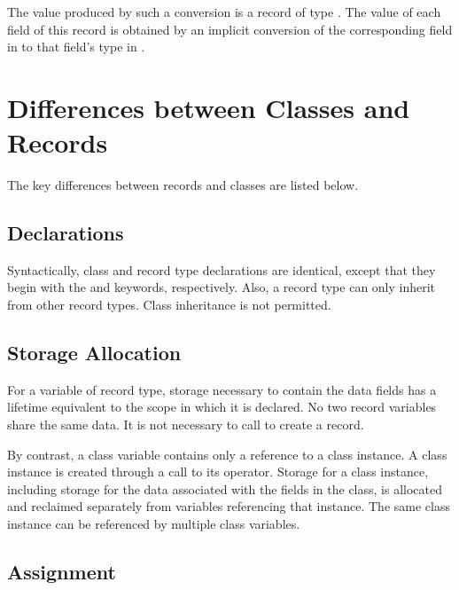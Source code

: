 The value produced by such a conversion is a record of type .
The value of each field of this record is obtained by an implicit
conversion of the corresponding field in  to
that field's type in .


\section{Differences between Classes and Records}
\label{Class_and_Record_Differences}

The key differences between records and classes are listed below.

\subsection{Declarations}
\label{Declaration_Differences}

Syntactically, class and record type declarations are identical, except that
they begin with the  and  keywords, respectively.
Also, a record type can only inherit from other record types.  Class inheritance
is not permitted.

\subsection{Storage Allocation}
\label{Storage_Allocation_Differences}

For a variable of record type, storage necessary to contain the data fields
has a lifetime equivalent to the scope in which it is declared.  No two record
variables share the same data.  It is not necessary to call  to create
a record.

By contrast, a class variable contains only a reference to a
class instance.  A class instance is created through a call to its 
operator.  Storage for a class instance, including storage for
the data associated with the fields in the class, is allocated and reclaimed
separately from variables referencing that instance.  The same class instance
can be referenced by multiple class variables.

\subsection{Assignment}
\label{Assignment_Differences}

